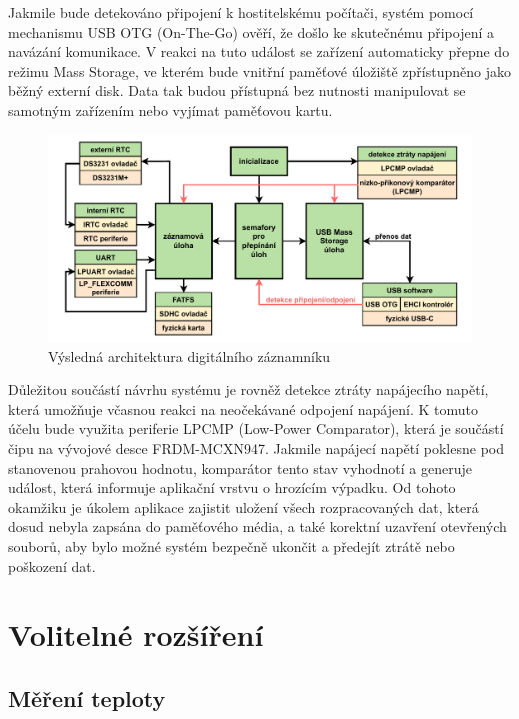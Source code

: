 Jakmile bude detekováno připojení k hostitelskému počítači, systém pomocí mechanismu USB OTG (On-The-Go) ověří, že došlo ke skutečnému připojení a navázání komunikace. V reakci na tuto událost se zařízení automaticky přepne do režimu Mass Storage, ve kterém bude vnitřní paměťové úložiště zpřístupněno jako běžný externí disk. Data tak budou přístupná bez nutnosti manipulovat se samotným zařízením nebo vyjímat paměťovou kartu.

\begin{figure}[h]
    \centering
    \includegraphics[width=1.00\textwidth]{obrazky-figures/system_architecture.pdf}
    
    \caption{Výsledná architektura digitálního záznamníku}
    \label{fig:system-architecture}
\end{figure}

Důležitou součástí návrhu systému je rovněž detekce ztráty napájecího napětí, která umožňuje včasnou reakci na neočekávané odpojení napájení. K tomuto účelu bude využita periferie LPCMP (Low-Power Comparator), která je součástí čipu na vývojové desce FRDM-MCXN947. Jakmile napájecí napětí poklesne pod stanovenou prahovou hodnotu, komparátor tento stav vyhodnotí a generuje událost, která informuje aplikační vrstvu o hrozícím výpadku. Od tohoto okamžiku je úkolem aplikace zajistit uložení všech rozpracovaných dat, která dosud nebyla zapsána do paměťového média, a také korektní uzavření otevřených souborů, aby bylo možné systém bezpečně ukončit a předejít ztrátě nebo poškození dat.



\section{Volitelné rozšíření}
\subsection{Měření teploty}

